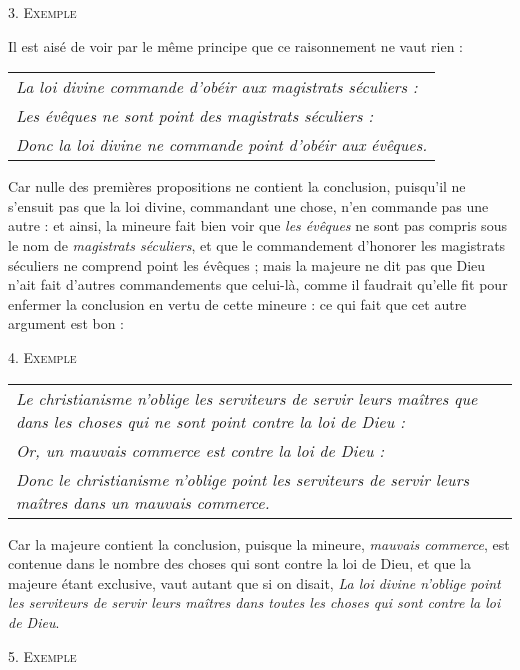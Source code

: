 \begin{center}{\scshape 3. Exemple}\end{center}

Il est aisé de voir par le même principe que ce raisonnement ne vaut rien :

	\begin{tabularx}{\textwidth}{X}
		\emph{La loi divine commande d'obéir aux magistrats séculiers :} \\
		\emph{Les évêques ne sont point des magistrats séculiers :} \\
		\emph{Donc la loi divine ne commande point d'obéir aux évêques.} \\
	\end{tabularx}

Car nulle des premières propositions ne contient la conclusion, puisqu'il ne s'ensuit pas que la loi divine, commandant une chose, n'en commande pas une autre : et ainsi, la mineure fait bien voir que \emph{les évêques} ne sont pas compris sous le nom de \emph{magistrats séculiers}, et que le commandement d'honorer les magistrats séculiers ne comprend point les évêques ; mais la majeure ne dit pas que Dieu n'ait fait d'autres commandements que celui-là, comme il faudrait qu'elle fit pour enfermer la conclusion en vertu de cette mineure : ce qui fait que cet autre argument est bon :


\begin{center}{\scshape 4. Exemple}\end{center}

	\begin{tabularx}{\textwidth}{X}
		\emph{Le christianisme n'oblige les serviteurs de servir leurs maîtres que dans les choses qui ne sont point contre la loi de Dieu :} \\
		\emph{Or, un mauvais commerce est contre la loi de Dieu :} \\
		\emph{Donc le christianisme n'oblige point les serviteurs de servir leurs maîtres dans un mauvais commerce.} \\
	\end{tabularx}

Car la majeure contient la conclusion, puisque la mineure, \emph{mauvais commerce}, est contenue dans le nombre des choses qui sont contre la loi de Dieu, et que la majeure étant exclusive, vaut autant que si on disait, \emph{La loi divine n'oblige point les serviteurs de servir leurs maîtres dans toutes les choses qui sont contre la loi de Dieu}.

\begin{center}{\scshape 5. Exemple}\end{center}

